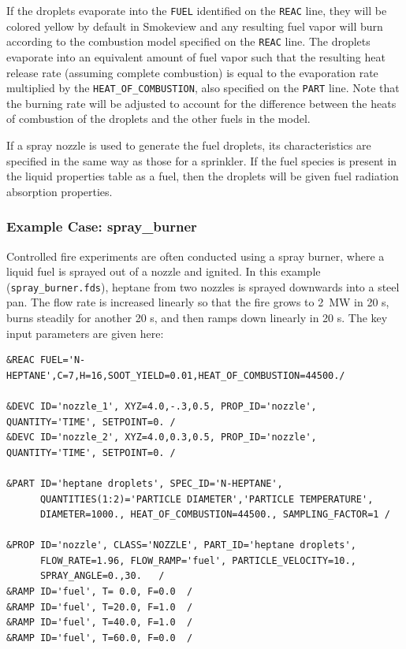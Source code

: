 \documentclass[11pt]{book}
\newcommand{\ct}{\tt\small}
\begin{document}
If the droplets evaporate into the {\ct FUEL} identified on the {\ct REAC} line, they will be colored yellow by default in Smokeview and any resulting
fuel vapor will burn according to the combustion model specified on the {\ct REAC} line.
The droplets evaporate into an equivalent amount of fuel vapor such that the resulting heat release rate
(assuming complete combustion) is equal to the evaporation rate multiplied by the {\ct HEAT\_OF\_COMBUSTION}, also specified on the {\ct PART} line. Note that the
burning rate will be adjusted to account for the difference between the heats of combustion of the droplets and the other fuels in the model.

If a spray nozzle is used to generate the fuel droplets, its characteristics are specified
in the same way as those for a sprinkler.  If the fuel species is present in the liquid properties table as a fuel, then the droplets will be given fuel radiation absorption properties.

\subsubsection{Example Case: spray\_burner}

Controlled fire experiments are often conducted using a spray burner,
where a liquid fuel is sprayed out of a nozzle and ignited. In this
example ({\ct spray\_burner.fds}), heptane from two nozzles is
sprayed downwards into a steel pan.  The flow rate is increased
linearly so that the fire grows to 2~MW in 20 s, burns steadily for
another 20 s, and then ramps down linearly in 20 s. The key input
parameters are given here:

\footnotesize
\begin{verbatim}
&REAC FUEL='N-HEPTANE',C=7,H=16,SOOT_YIELD=0.01,HEAT_OF_COMBUSTION=44500./

&DEVC ID='nozzle_1', XYZ=4.0,-.3,0.5, PROP_ID='nozzle', QUANTITY='TIME', SETPOINT=0. /
&DEVC ID='nozzle_2', XYZ=4.0,0.3,0.5, PROP_ID='nozzle', QUANTITY='TIME', SETPOINT=0. /

&PART ID='heptane droplets', SPEC_ID='N-HEPTANE',
      QUANTITIES(1:2)='PARTICLE DIAMETER','PARTICLE TEMPERATURE',
      DIAMETER=1000., HEAT_OF_COMBUSTION=44500., SAMPLING_FACTOR=1 /

&PROP ID='nozzle', CLASS='NOZZLE', PART_ID='heptane droplets',
      FLOW_RATE=1.96, FLOW_RAMP='fuel', PARTICLE_VELOCITY=10.,
      SPRAY_ANGLE=0.,30.   /
&RAMP ID='fuel', T= 0.0, F=0.0  /
&RAMP ID='fuel', T=20.0, F=1.0  /
&RAMP ID='fuel', T=40.0, F=1.0  /
&RAMP ID='fuel', T=60.0, F=0.0  /
\end{verbatim}
\normalsize
\end{document}
